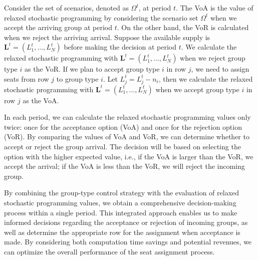 Consider the set of scenarios, denoted as $\Omega^{t}$, at period $t$. The VoA is the value of 
relaxed stochastic programming by considering the scenario set $\Omega^{t}$ when we accept the arriving group at period $t$. On the other hand, the VoR is calculated when we reject the arriving arrival. Suppose the available supply is $\mathbf{L}^{t} = (L_1^{t}, \ldots, L_N^{t})$ before making the decision at period $t$. We calculate the relaxed stochastic programming with $\mathbf{L}^{t}= (L_1^{t}, \ldots, L_N^{t})$ when we reject group type $i$ as the VoR. If we plan to accept group type $i$ in row $j$, we need to assign seats from row $j$ to group type $i$. Let $L_j^{t} = L_j^{t} - n_{i}$, then we calculate the relaxed stochastic programming with $\mathbf{L}^{t}= (L_1^{t}, \ldots, L_N^{t})$ when we accept group type $i$ in row $j$ as the VoA.

In each period, we can calculate the relaxed stochastic programming values only twice: once for the acceptance option (VoA) and once for the rejection option (VoR). By comparing the values of VoA and VoR, we can determine whether to accept or reject the group arrival. The decision will be based on selecting the option with the higher expected value, i.e., if the VoA is larger than the VoR, we accept the arrival; if the VoA is less than the VoR, we will reject the incoming group.



By combining the group-type control strategy with the evaluation of relaxed stochastic programming values, we obtain a comprehensive decision-making process within a single period. This integrated approach enables us to make informed decisions regarding the acceptance or rejection of incoming groups, as well as determine the appropriate row for the assignment when acceptance is made. By considering both computation time savings and potential revenues, we can optimize the overall performance of the seat assignment process.


